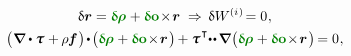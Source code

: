 \nopagebreak\vspace{-0.25em}\begin{equation*}
\begin{array}{c}
\variation{\currentlocationvector} = \constvarvector{\hspace{-0.1ex}\bm{\rho}} \hspace{.1ex} + \constvarvector{o} \hspace{-0.33ex} \times \hspace{-0.33ex} \currentlocationvector
%
\hspace{.66ex}\Rightarrow\hspace{.4ex}
%
\variation{\internalwork} \hspace{-0.2ex} = 0
\hspace{.1ex} ,
\\[.4em]
%
\bigl( \hspace{.1ex} \boldnabla \dotp \cauchystress \hspace{.1ex} + \hspace{-0.1ex} \massdensity \hspace{-0.1ex} \massloadvector \hspace{.16ex} \bigr)
\hspace{-0.25ex} \dotp \hspace{-0.25ex}
\bigl(  \constvarvector{\hspace{-0.1ex}\bm{\rho}} \hspace{.1ex} + \constvarvector{o} \hspace{-0.33ex} \times \hspace{-0.33ex} \currentlocationvector \hspace{.2ex} \bigr) \hspace{-0.16ex}
+ \cauchystress^{\hspace{.16ex}\T} \hspace{-0.5ex}
\dotdotp
\hspace{-0.16ex} \boldnabla \hspace{.1ex} \bigl(
\constvarvector{\hspace{-0.1ex}\bm{\rho}} \hspace{.1ex} +
\constvarvector{o} \hspace{-0.33ex} \times \hspace{-0.33ex} \currentlocationvector \hspace{.2ex} \bigr) \hspace{-0.25ex}
= 0 \hspace{.1ex} ,
\\[.4em]

\end{array}
\end{equation*}
